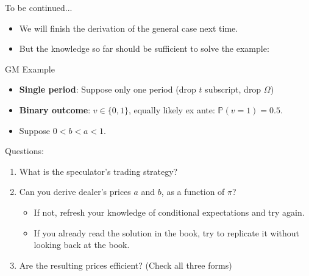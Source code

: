 \documentclass[english,10pt
,aspectratio=169
]{beamer}
\begin{document}
\begin{frame}{To be continued...}
	\begin{itemize}
		\item We will finish the derivation of the general case next time.
		\item But the knowledge so far should be sufficient to solve the example:
	\end{itemize}
	\begin{exampleblock}{GM Example}
		\begin{itemize}
			\item \textbf{Single period}: Suppose only one period (drop $t$ subscript, drop $\Omega$)
			\item \textbf{Binary outcome}: $v \in \{ 0, 1\}$, equally likely ex ante: $\mathbb{P}(v=1) = 0.5$.
			\item Suppose $0 < b < a < 1$. 
		\end{itemize}
		Questions:
		\begin{enumerate}
			\item What is the speculator's trading strategy?
			\item Can you derive dealer's \alert{prices $a$ and $b$}, as a function of $\pi$?
			\begin{itemize}
				\item If not, refresh your knowledge of conditional expectations and try again.
				\item If you already read the solution in the book, try to replicate it without looking back at the book.
			\end{itemize}
			\item Are the resulting prices efficient? (Check all three forms)
		\end{enumerate}
	\end{exampleblock}
\end{frame}
\end{document}

